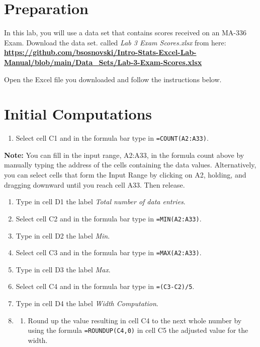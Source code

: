 \documentclass[
]{book}
\providecommand{\tightlist}{%
  \setlength{\itemsep}{0pt}\setlength{\parskip}{0pt}}
\begin{document}
\hypertarget{preparation}{%
\section{Preparation}\label{preparation}}

In this lab, you will use a data set that contains scores received on an MA-336 Exam. Download the data set. called \emph{Lab 3 Exam Scores.xlsx} from here: \href{https://github.com/bsosnovski/Intro-Stats-Excel-Lab-Manual/blob/main/Data_Sets/Lab-3-Exam-Scores.xlsx}{\textbf{https://github.com/bsosnovski/Intro-Stats-Excel-Lab-Manual/blob/main/Data\_Sets/Lab-3-Exam-Scores.xlsx}}

Open the Excel file you downloaded and follow the instructions below.

\hypertarget{initial-computations}{%
\section{Initial Computations}\label{initial-computations}}

\begin{enumerate}
\def\labelenumi{\arabic{enumi}.}
\tightlist
\item
  Select cell C1 and in the formula bar type in \texttt{=COUNT(A2:A33)}.
\end{enumerate}

\textbf{Note:} You can fill in the input range, A2:A33, in the formula count above by manually typing the address of the cells containing the data values. Alternatively, you can select cells that form the Input Range by clicking on A2, holding, and dragging downward until you reach cell A33. Then release.

\begin{enumerate}
\def\labelenumi{\arabic{enumi}.}
\setcounter{enumi}{1}
\item
  Type in cell D1 the label \emph{Total number of data entries}.
\item
  Select cell C2 and in the formula bar type in \texttt{=MIN(A2:A33)}.
\item
  Type in cell D2 the label \emph{Min}.
\item
  Select cell C3 and in the formula bar type in \texttt{=MAX(A2:A33)}.
\item
  Type in cell D3 the label \emph{Max}.
\item
  Select cell C4 and in the formula bar type in \texttt{=(C3-C2)/5}.
\item
  Type in cell D4 the label \emph{Width Computation}.
\item
  \begin{enumerate}
  \def\labelenumii{\arabic{enumii})}
  \setcounter{enumii}{8}
  \tightlist
  \item
    Round up the value resulting in cell C4 to the next whole number by using the formula \texttt{=ROUNDUP(C4,0)} in cell C5 the adjusted value for the width.
  \end{enumerate}
\end{enumerate}
\end{document}
